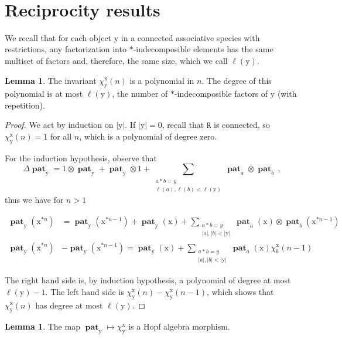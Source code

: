\documentclass[12pt, reqno]{amsart}
\theoremstyle{definition}
\newtheorem{lm}[thm]{Lemma}
\DeclareMathOperator{\pat}{\mathbf{pat}}
\newcommand{\xx}{\mathrm{x}}
\newcommand{\yy}{\mathrm{y}}
\begin{document}
\

\section{Reciprocity results\label{sec:recip}}



We recall that for each object $\yy$ in a connected associative species with restrictions, any factorization into $\ast$-indecomposible elements has the same multiset of factors and, therefore, the same size, which we call $\ell(\yy)$.

\begin{lm}\label{lm:polynomial}
The invariant $\chi^{\xx}_{\yy}(n)$ is a polynomial in $n$.
The degree of this polynomial is at most $\ell(\yy)$, the number of $\ast$-indecomposible factors of $\yy$ (with repetition).
\end{lm}


\begin{proof}
We act by induction on $|\yy|$.
If $|\yy| = 0$, recall that $\mathtt{R}$ is connected, so $\chi^{\xx}_{\yy}(n) = 1$ for all $n$, which is a polynomial of degree zero.

For the induction hypothesis, observe that 
$$\Delta \pat_{\yy} = 1\otimes \pat_{\yy} + \pat_{\yy} \otimes 1 + \sum_{\substack{a \ast b = y\\\ell(a), \ell(b) < \ell(\yy)}} \pat_a \otimes \pat_b \, ,$$
thus we have for $n > 1$ 

\begin{equation*}
    \begin{split}
        \pat_{\yy}(\xx^{\ast n}) &= \pat_{\yy}(\xx^{\ast n-1}) + \pat_{\yy}(\xx) + \sum_{\substack{a \ast b = y\\|a|, |b| < |\yy|}} \pat_a (\xx) \otimes \pat_b (\xx^{\ast n-1}) \\
         \pat_{\yy}(\xx^{\ast n}) &- \pat_{\yy}(\xx^{\ast n-1}) = \pat_{\yy}(\xx) + \sum_{\substack{a \ast b = y\\|a|, |b| < |\yy|}} \pat_a (\xx) \chi^{\xx}_b ( n-1)
    \end{split}
\end{equation*}

The right hand side is, by induction hypothesis, a polynomial of degree at most $\ell(\yy) -1$.
The left hand side is $\chi^{\xx}_{\yy}(n) - \chi^{\xx}_{\yy}(n-1)$, which shows that $\chi^{\xx}_{\yy}(n)$ has degree at most $\ell(\yy)$.
\end{proof}


\begin{lm}\label{lm:HA_morphism}
The map $\pat_{\yy} \mapsto \chi^{\xx}_{\yy}$ is a Hopf algebra morphism.
\end{lm}
\end{document}

